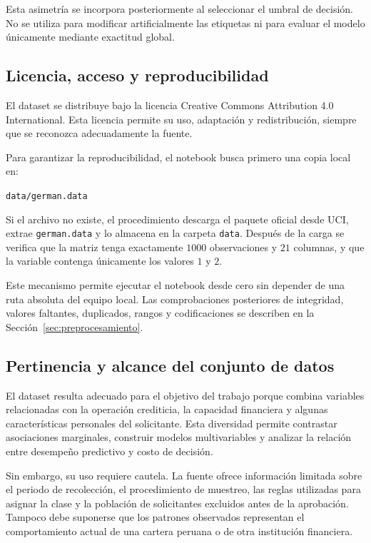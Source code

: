 Esta asimetría se incorpora posteriormente al seleccionar el umbral de
decisión. No se utiliza para modificar artificialmente las etiquetas ni
para evaluar el modelo únicamente mediante exactitud global.

\subsection{Licencia, acceso y reproducibilidad}

El dataset se distribuye bajo la licencia
Creative Commons Attribution 4.0 International. Esta licencia permite
su uso, adaptación y redistribución, siempre que se reconozca
adecuadamente la fuente.

Para garantizar la reproducibilidad, el notebook busca primero una copia
local en:

\begin{center}
    \texttt{data/german.data}
\end{center}

Si el archivo no existe, el procedimiento descarga el paquete oficial
desde UCI, extrae \texttt{german.data} y lo almacena en la carpeta
\texttt{data}. Después de la carga se verifica que la matriz tenga
exactamente \(1000\) observaciones y \(21\) columnas, y que la variable
 contenga únicamente los valores \(1\) y \(2\).

Este mecanismo permite ejecutar el notebook desde cero sin depender de
una ruta absoluta del equipo local. Las comprobaciones posteriores de
integridad, valores faltantes, duplicados, rangos y codificaciones se
describen en la Sección~\ref{sec:preprocesamiento}.

\subsection{Pertinencia y alcance del conjunto de datos}

El dataset resulta adecuado para el objetivo del trabajo porque combina
variables relacionadas con la operación crediticia, la capacidad
financiera y algunas características personales del solicitante. Esta
diversidad permite contrastar asociaciones marginales, construir modelos
multivariables y analizar la relación entre desempeño predictivo y costo
de decisión.

Sin embargo, su uso requiere cautela. La fuente ofrece información
limitada sobre el periodo de recolección, el procedimiento de muestreo,
las reglas utilizadas para asignar la clase y la población de
solicitantes excluidos antes de la aprobación. Tampoco debe suponerse
que los patrones observados representan el comportamiento actual de una
cartera peruana o de otra institución financiera.

